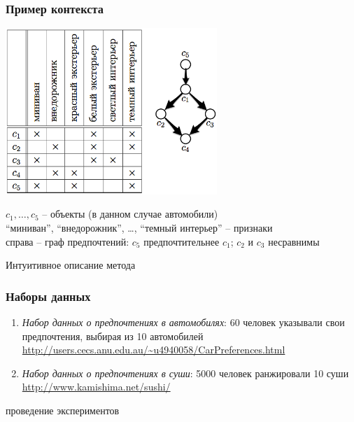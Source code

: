 \documentclass[xcolor=table]{beamer}
\theoremstyle{definition}
\begin{document}
	\begin{frame}
		\frametitle{Пример контекста}
		\begin{center}
		\includegraphics[width=80mm]{./images/context.png}
		\end{center}
		\vspace{-1.5ex}
		 $c_1, \dotsc, c_5$ – объекты (в данном случае автомобили) \\
		 ``миниван'', ``внедорожник'', \dots, ``темный интерьер'' – признаки \\
		 \vspace{1ex}
		 справа – граф предпочтений: $c_5$ предпочтительнее $c_1$; $c_2$ и $c_3$ несравнимы
	\end{frame}
	
	\begin{frame}
		Интуитивное описание метода 
	\end{frame}
	
	\begin{frame}
		\frametitle{Наборы данных}
		\begin{enumerate}
			\item \emph{Набор данных о предпочтениях в автомобилях}: 60 человек указывали свои предпочтения, выбирая из 10 автомобилей \cite{dataset:Abbasnejad:2013} \\
			\url{http://users.cecs.anu.edu.au/~u4940058/CarPreferences.html}
			\vspace{1em}
			\item \emph{Набор данных о предпочтениях в суши}: 5000 человек ранжировали 10 суши \cite{Kamishima:2003}
			\url{http://www.kamishima.net/sushi/}
		\end{enumerate}
	\end{frame}
	
	\begin{frame}
		проведение экспериментов
	\end{frame}
	
\end{document}
